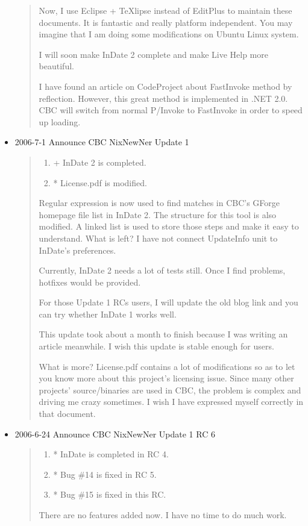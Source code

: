 \begin{itemize}
\begin{quotation}
    Now, I use Eclipse + TeXlipse instead of EditPlus to maintain these
    documents. It is fantastic and really platform independent. You may
    imagine that I am doing some modifications on Ubuntu Linux system.

    I will soon make InDate 2 complete and make Live Help more beautiful.

    I have found an article on CodeProject about FastInvoke method by
    reflection. However, this great method is implemented in .NET 2.0. CBC
    will switch from normal P/Invoke to FastInvoke in order to speed up
    loading.
  \end{quotation}

  \item 2006-7-1 Announce CBC NixNewNer Update 1

  \begin{quotation}
    \begin{enumerate}
      \item + InDate 2 is completed.
      \item * License.pdf is modified.
    \end{enumerate}
    Regular expression is now used to find matches in CBC's GForge
    homepage file list in InDate 2. The structure for this tool is also
    modified. A linked list is used to store those steps and make it
    easy to understand. What is left? I have not connect UpdateInfo
    unit to InDate's preferences.

    Currently, InDate 2 needs a lot of tests still. Once I find problems,
    hotfixes would be provided.

    For those Update 1 RCs users, I will update the old blog link and you
    can try whether InDate 1 works well.

    This update took about a month to finish because I was writing an
    article meanwhile. I wish this update is stable enough for users.

    What is more? License.pdf contains a lot of modifications so as to let
    you know more about this project's licensing issue. Since many other
    projects' source/binaries are used in CBC, the problem is complex and
    driving me crazy sometimes. I wish I have expressed myself correctly in
    that document.
  \end{quotation}

  \item 2006-6-24 Announce CBC NixNewNer Update 1 RC 6

  \begin{quotation}
    \begin{enumerate}
      \item * InDate is completed in RC 4.
      \item * Bug \#14 is fixed in RC 5.
      \item * Bug \#15 is fixed in this RC.
    \end{enumerate}
    There are no features added now. I have no time to do much work.
  \end{quotation}


\end{itemize}

